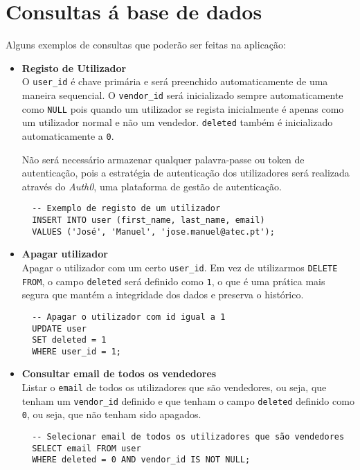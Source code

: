 ﻿\section{Consultas á base de dados} \label{section: Consultas}

Alguns exemplos de consultas que poderão ser feitas na aplicação:

\begin{itemize}
  \item \textbf{Registo de Utilizador}\\ 
  O \texttt{user\_id} é chave primária e será preenchido automaticamente de uma maneira sequencial. O  \texttt{vendor\_id} será inicializado sempre automaticamente como \texttt{NULL} pois quando um utilizador se regista inicialmente é apenas como um utilizador normal e não um vendedor. \texttt{deleted} também é inicializado automaticamente a \texttt{0}.
  \par
  Não será necessário armazenar qualquer palavra-passe ou token de autenticação, pois a estratégia de autenticação dos utilizadores será realizada através do \textit{Auth0}, uma plataforma de gestão de autenticação.
  
  \vspace{10pt}
    \begin{lstlisting}
  -- Exemplo de registo de um utilizador
  INSERT INTO user (first_name, last_name, email)
  VALUES ('José', 'Manuel', 'jose.manuel@atec.pt');
      \end{lstlisting}
  \item \textbf{Apagar utilizador}\\ 
      Apagar o utilizador com um certo \texttt{user\_id}. Em vez de utilizarmos \texttt{DELETE FROM}, o campo \texttt{deleted} será definido como \texttt{1}, o que é uma prática mais segura que mantém a integridade dos dados e preserva o histórico.
      \vspace{10pt}
      \begin{lstlisting}
  -- Apagar o utilizador com id igual a 1
  UPDATE user
  SET deleted = 1
  WHERE user_id = 1;        
        \end{lstlisting}    
  \item \textbf{Consultar email de todos os vendedores}\\ 
    Listar o \texttt{email} de todos os utilizadores que são vendedores, ou seja, que tenham um \texttt{vendor\_id} definido e que tenham o campo \texttt{deleted} definido como \texttt{0}, ou seja, que não tenham sido apagados.
    \vspace{10pt}
    \begin{lstlisting}
  -- Selecionar email de todos os utilizadores que são vendedores
  SELECT email FROM user
  WHERE deleted = 0 AND vendor_id IS NOT NULL;
      \end{lstlisting}


\end{itemize}
